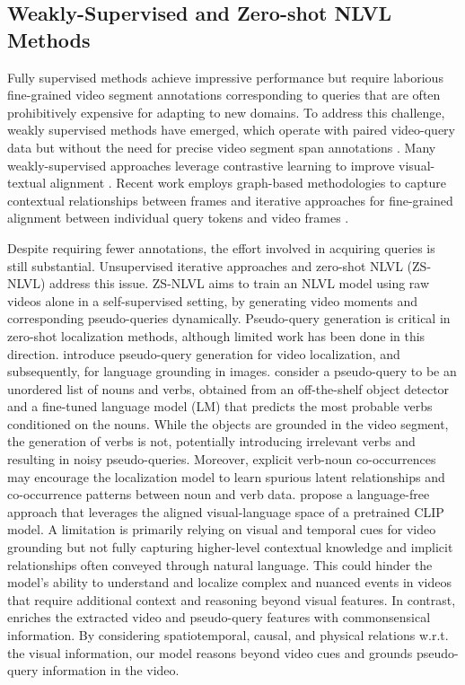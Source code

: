 \subsection{Weakly-Supervised and Zero-shot NLVL Methods}
Fully supervised methods achieve impressive performance but require laborious
fine-grained video segment annotations corresponding to queries that are often prohibitively expensive for adapting to new domains. To address this challenge, weakly supervised methods have emerged, which operate with paired video-query data but without the need for precise video segment span annotations 
\cite{huang_cross-sentence_2021,zhang_counterfactual_2020,ma_vlanet_2020, 
detr}.
Many weakly-supervised approaches leverage contrastive learning to improve visual-textual alignment \cite{zhang_counterfactual_2020, zhang_video_2021, ma_vlanet_2020}. Recent work employs graph-based methodologies to capture contextual relationships between frames \cite{tan_logan_2021} and iterative approaches for fine-grained alignment between individual query tokens and video frames \cite{wang_fine-grained_2021}. 


Despite requiring fewer annotations, the effort involved in acquiring queries is still substantial. Unsupervised iterative approaches \cite{liu_unsupervised_2022} and zero-shot NLVL (ZS-NLVL) \cite{nam_zero-shot_2021} address this issue. ZS-NLVL aims to train an NLVL model using raw videos alone in a self-supervised setting, by generating video moments and corresponding pseudo-queries dynamically.
Pseudo-query generation is critical in zero-shot localization methods, although limited work has been done in this direction. \citet{nam_zero-shot_2021} introduce pseudo-query generation for video localization, and subsequently, \citet{jiang_pseudo-q_2022} for language grounding in images.
\citet{nam_zero-shot_2021} consider a pseudo-query to be an unordered list of nouns and verbs, obtained from an off-the-shelf object detector and a fine-tuned language model (LM) that predicts the most probable verbs conditioned on the nouns. While the objects are grounded in the video segment, the generation of verbs is not, potentially introducing irrelevant verbs and resulting in noisy pseudo-queries. Moreover, explicit verb-noun co-occurrences may encourage the localization model to learn spurious latent relationships and co-occurrence patterns between noun and verb data.
\citet{kim2023language} propose a language-free approach that leverages the aligned visual-language space of a pretrained CLIP model. A limitation is primarily relying on visual and temporal cues for video grounding but not fully capturing higher-level contextual knowledge and implicit relationships often conveyed through natural language. This could hinder the model's ability to understand and localize complex and nuanced events in videos that require additional context and reasoning beyond visual features.
In contrast, \modelname enriches the extracted video and pseudo-query features with commonsensical information. By considering spatiotemporal, causal, and physical relations w.r.t. the visual information, our model reasons beyond video cues and grounds pseudo-query information in the video.


